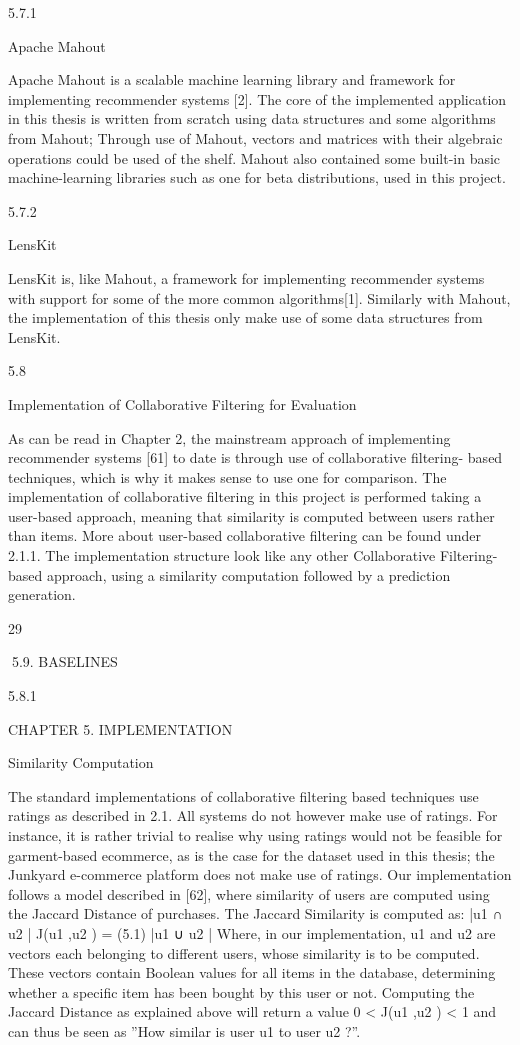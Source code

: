 5.7.1

Apache Mahout

Apache Mahout is a scalable machine learning library and framework for implementing
recommender systems [2]. The core of the implemented application in this thesis is
written from scratch using data structures and some algorithms from Mahout; Through
use of Mahout, vectors and matrices with their algebraic operations could be used of the
shelf. Mahout also contained some built-in basic machine-learning libraries such as one
for beta distributions, used in this project.

5.7.2

LensKit

LensKit is, like Mahout, a framework for implementing recommender systems with support for some of the more common algorithms[1]. Similarly with Mahout, the implementation of this thesis only make use of some data structures from LensKit.

5.8

Implementation of Collaborative Filtering for Evaluation

As can be read in Chapter 2, the mainstream approach of implementing recommender
systems [61] to date is through use of collaborative filtering- based techniques, which
is why it makes sense to use one for comparison. The implementation of collaborative
filtering in this project is performed taking a user-based approach, meaning that similarity is computed between users rather than items. More about user-based collaborative
filtering can be found under 2.1.1. The implementation structure look like any other
Collaborative Filtering-based approach, using a similarity computation followed by a
prediction generation.

29

5.9. BASELINES

5.8.1

CHAPTER 5. IMPLEMENTATION

Similarity Computation

The standard implementations of collaborative filtering based techniques use ratings as
described in 2.1. All systems do not however make use of ratings. For instance, it is
rather trivial to realise why using ratings would not be feasible for garment-based ecommerce, as is the case for the dataset used in this thesis; the Junkyard e-commerce
platform does not make use of ratings.
Our implementation follows a model described in [62], where similarity of users are
computed using the Jaccard Distance of purchases. The Jaccard Similarity is computed
as:
|u1 ∩ u2 |
J(u1 ,u2 ) =
(5.1)
|u1 ∪ u2 |
Where, in our implementation, u1 and u2 are vectors each belonging to different users,
whose similarity is to be computed. These vectors contain Boolean values for all items in
the database, determining whether a specific item has been bought by this user or not.
Computing the Jaccard Distance as explained above will return a value 0 < J(u1 ,u2 ) < 1
and can thus be seen as ”How similar is user u1 to user u2 ?”.

